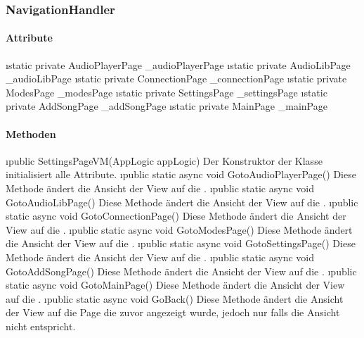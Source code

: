 \documentclass[../entwurf.tex]{subfiles}
\begin{document}
\subsubsection{NavigationHandler}
\paragraph{Attribute}
\begin{itemize}
	\i{static private AudioPlayerPage \_audioPlayerPage}
	\i{static private AudioLibPage \_audioLibPage}
	\i{static private ConnectionPage \_connectionPage}
	\i{static private ModesPage \_modesPage}
	\i{static private SettingsPage \_settingsPage}
	\i{static private AddSongPage \_addSongPage}
	\i{static private MainPage \_mainPage}
\end{itemize}
\paragraph{Methoden}
\begin{itemize}
	\i{public SettingsPageVM(AppLogic appLogic)} Der Konstruktor der Klasse initialisiert alle Attribute.
	\i{public static async void GotoAudioPlayerPage()} Diese Methode ändert die Ansicht der View auf die .
	\i{public static async void GotoAudioLibPage()} Diese Methode ändert die Ansicht der View auf die .
	\i{public static async void GotoConnectionPage()} Diese Methode ändert die Ansicht der View auf die .
	\i{public static async void GotoModesPage()} Diese Methode ändert die Ansicht der View auf die .
	\i{public static async void GotoSettingsPage()} Diese Methode ändert die Ansicht der View auf die .
	\i{public static async void GotoAddSongPage()} Diese Methode ändert die Ansicht der View auf die .
	\i{public static async void GotoMainPage()} Diese Methode ändert die Ansicht der View auf die .
	\i{public static async void GoBack()} Diese Methode ändert die Ansicht der View auf die Page die zuvor angezeigt wurde, jedoch nur falls die Ansicht nicht  entspricht.
\end{itemize}

\end{document}
